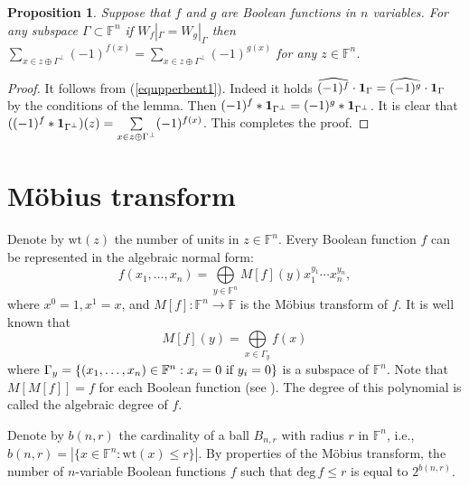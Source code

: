 \documentclass[a4paper,12pt]{article}   %
\newtheorem{proposition}{Proposition}
\begin{document}
\begin{proposition}\label{cor:Sar}
Suppose that $f$ and $g$ are Boolean functions in $n$ variables. For
any subspace $\Gamma\subset \mathbb{F}^n$ if
$W_f|_\Gamma=W_g|_\Gamma$ then $\sum\limits_{x\in
z\oplus\Gamma^\perp}(-1)^{f(x)}=\sum\limits_{x\in
z\oplus\Gamma^\perp}(-1)^{g(x)}$ for any $z\in \mathbb{F}^n$.
\end{proposition}
\begin{proof} It follows from (\ref{equpperbent1}). Indeed it holds
$\widehat{(-1)^f}\cdot{\bf1}_{\Gamma}=\widehat{(-1)^g}\cdot{\bf1}_{\Gamma}$
by the conditions of the lemma. Then
$(-1)^f*{\bf1}_{\Gamma^\perp}=(-1)^g*{\bf1}_{\Gamma^\perp}$. It is
clear that $((-1)^f*{\bf1}_{\Gamma^\perp})(z)=\sum\limits_{x\in
z\oplus\Gamma^\perp}(-1)^{f(x)}$. This completes the
proof.\end{proof}

\section{M\"obius  transform}



Denote by $\mathrm{wt}(z)$  the number of units in $z\in
\mathbb{F}^n$. Every Boolean function $f$ can be represented in the
algebraic normal form:
\begin{equation}\label{equpperbent00}
 f(x_1,\dots,x_n)=\bigoplus\limits_{y\in
    \mathbb{F}^n}M[f](y)x_1^{y_1}\cdots x_n^{y_n},
\end{equation}
     where $x^0=1, x^1=x$, and
$M[f]:\mathbb{F}^n\rightarrow \mathbb{F}$ is the M\"obius transform
of $f$. It is well known that
\begin{equation}\label{equpperbent0}
M[f](y)=\bigoplus\limits_{x\in \Gamma_y}f(x)
\end{equation}
where $\Gamma_y=\{(x_1,\dots,x_n)\in \mathbb{F}^n : x_i=0 \
\mbox{\rm if} \ y_i=0\}$ is a subspace of $\mathbb{F}^n$. Note that
$M[M[f]]=f$ for each Boolean function (see \cite[Theorem
1]{Carlet}).
 The degree of this polynomial   is called  the algebraic
degree  of $f$.

Denote by $b(n,r)$ the cardinality of a ball $B_{n,r}$ with radius
$r$ in $\mathbb{F}^n$, i.e., $b(n,r)=|\{x\in \mathbb{F}^n :
\mathrm{wt}(x)\leq r\}|$.
 By properties of the M\"obius transform, the number
of $n$-variable Boolean functions $f$ such that $\mathrm{
deg}\,f\leq r$ is equal to $2^{b(n,r)}$.

\end{document}

